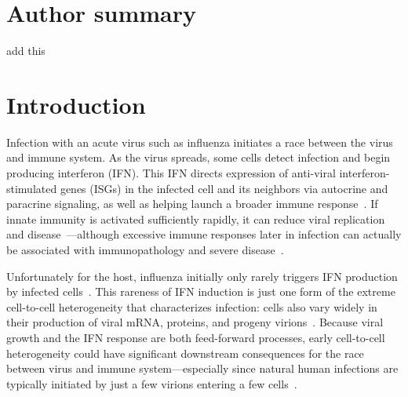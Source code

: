 \documentclass[10pt,letterpaper]{article}
\begin{document}
\section*{Author summary}
{\color{red} add this}

\linenumbers

\section*{Introduction}
Infection with an acute virus such as influenza initiates a race between the virus and immune system.
As the virus spreads, some cells detect infection and begin producing interferon (IFN).
This IFN directs expression of anti-viral interferon-stimulated genes (ISGs) in the infected cell and its neighbors via autocrine and paracrine signaling, as well as helping launch a broader immune response~\cite{stetson2006type,honda2006type}.
If innate immunity is activated sufficiently rapidly, it can reduce viral replication and disease~\cite{solov1969results,treanor1987intranasally,beilharz2007protection,kugel2009intranasal,steel2010transmission}---although excessive immune responses later in infection can actually be associated with immunopathology and severe disease~\cite{la2007question, iwasaki2014innate}.

Unfortunately for the host, influenza initially only rarely triggers IFN production by infected cells~\cite{kallfass2013visualizing, killip2017single}.
This rareness of IFN induction is just one form of the extreme cell-to-cell heterogeneity that characterizes infection: cells also vary widely in their production of viral mRNA, proteins, and progeny virions~\cite{russell2018extreme,steuerman2018dissection,sjaastad2018distinct,heldt2015single}.
Because viral growth and the IFN response are both feed-forward processes, early cell-to-cell heterogeneity could have significant downstream consequences for the race between virus and immune system---especially since natural human infections are typically initiated by just a few virions entering a few cells~\cite{mccrone2018stochastic, xue2018reconciling, varble2014influenza}.
\end{document}
